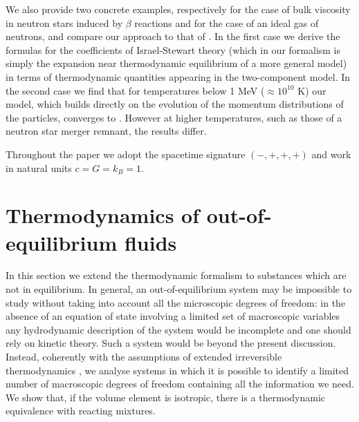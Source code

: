 \documentclass[useAMS,usenatbib,prd,twocolumn,nofootinbib]{revtex4-1}
\begin{document}
We also provide two concrete examples, respectively for the case of bulk viscosity in neutron stars induced by $\beta$ reactions and for the case of an ideal gas of neutrons, and compare our approach to that of \citet{Israel_Stewart_1979}. In the first case we derive the formulas for the coefficients of Israel-Stewart theory (which in our formalism is simply the expansion near thermodynamic equilibrium of a more general model) in terms of thermodynamic quantities appearing in the two-component model. In the second case we find that for temperatures below 1 MeV ($\approx 10^{10}$ K) our model, which builds directly on the evolution of the momentum distributions of the particles, converges to \cite{Israel_Stewart_1979}. However at higher temperatures, such as those of a neutron star merger remnant, the results differ.

Throughout the paper we adopt the spacetime signature $ ( - , +, + , + ) $ and work in natural units $c=G=k_B=1$. 









\section{Thermodynamics of out-of-equilibrium fluids}\label{TOOOEF}

In this section we extend the thermodynamic formalism to substances which are not in equilibrium. 
In general, an out-of-equilibrium system may be impossible to study without taking into account all the microscopic degrees of freedom: in the absence of an equation of state involving a limited set of macroscopic variables any hydrodynamic description of the system would be incomplete and one should rely on kinetic theory. 
Such a system would be beyond the present discussion. 
Instead, coherently with the assumptions of extended irreversible thermodynamics \cite{Jou_Extended}, we analyse systems in which it is possible to identify a limited number of macroscopic degrees of freedom containing all the information we need. 
We show that, if the volume element is isotropic, there is a thermodynamic equivalence with reacting mixtures. 
\end{document}
